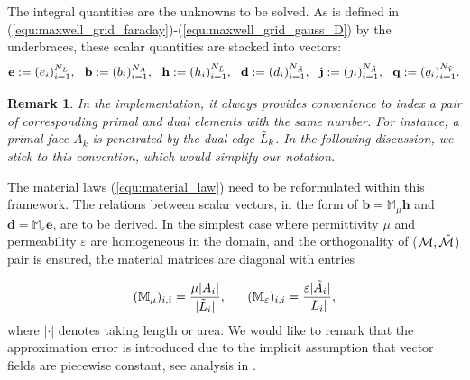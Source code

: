 \documentclass{article}
\newtheorem*{remark}{Remark}
\begin{document}
The integral quantities are the unknowns to be solved. As is defined in (\ref{equ:maxwell_grid_faraday})-(\ref{equ:maxwell_grid_gauss_D}) by the underbraces, these scalar quantities are stacked into vectors:
\begin{equation} \label{equ:fit_scale_vector}
    \mathbf{e} := (e_i)_{i=1}^{N_L},\ \ \mathbf{b} := (b_i)_{i=1}^{N_A}, \ \ \mathbf{h} := (h_i)_{i=1}^{N_{\Tilde{L}}}, \ \ \mathbf{d} := (d_i)_{i=1}^{N_{\Tilde{A}}}, \ \ \mathbf{j} := (j_i)_{i=1}^{N_{\Tilde{A}}}, \ \ \mathbf{q} := (q_i)_{i=1}^{N_{\Tilde{V}}}.
\end{equation}

\begin{remark}
    In the implementation, it always provides convenience to index a pair of corresponding primal and dual elements with the same number. For instance, a primal face $A_k$ is penetrated by the dual edge $\Tilde{L}_k$. In the following discussion, we stick to this convention, which would simplify our notation.
\end{remark}

The material laws (\ref{equ:material_law}) need to be reformulated within this framework. The relations between scalar vectors, in the form of $\mathbf{b} = \mathbb{M}_\mu \mathbf{h}$ and $\mathbf{d} = \mathbb{M}_\varepsilon \mathbf{e}$, are to be derived. In the simplest case where permittivity $\mu$ and permeability $\varepsilon$ are homogeneous in the domain, and the orthogonality of ($\mathcal{M}, \Tilde{\mathcal{M}}$) pair is ensured, the material matrices are diagonal with entries 

\begin{equation*}
    (\mathbb{M}_\mu)_{i,i} = \frac{\mu|A_i|}{|\Tilde{L}_i|}, \ \ \ \ \ (\mathbb{M}_\varepsilon)_{i,i} = \frac{\varepsilon |\Tilde{A}_i|}{|L_i|},
\end{equation*}
where $|\cdot|$ denotes taking length or area. We would like to remark that the approximation error is introduced due to the implicit assumption that vector fields are piecewise constant, see analysis in \cite{Marrone_2001}.
\end{document}
